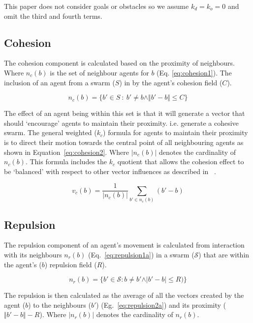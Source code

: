 \documentclass[12pt,a4paper]{IEEEtran}
\newcommand{\magn}[1]{\Vert{#1}\Vert}
\newcommand{\card}[1]{\vert{#1}\vert}
\newcommand{\vbb}[2]{#2-#1}
\newcommand{\kc}{\mathit{k_c}}
\newcommand{\kd}{\mathit{k_d}}
\newcommand{\ko}{\mathit{k_o}}
\newcommand{\rb}{\mathit{R}}
\begin{document}
This paper does not consider goals or obstacles so we assume $\kd = \ko = 0$ and omit the third and fourth terms.

\subsection{Cohesion}\label{cohesion}
The cohesion component is calculated based on the proximity of neighbours. Where $n_c(b)$ is the set of neighbour agents for $b$ (Eq. \ref{eq:cohesion1}). The inclusion of an agent from a swarm ($S$) in by the agent's cohesion field ($C$).

\begin{equation}\label{eq:cohesion1}
n_c(b) = \{b' \in S~:~b' \neq b \land\magn{\vbb{b}{b'}} \leq C\}
\end{equation}

The effect of an agent being within this set is that it will generate a vector that should `encourage' agents to maintain their proximity. i.e. generate a cohesive swarm. The general weighted ($\kc$) formula for agents to maintain their proximity is to direct their motion towards the central point of all neighbouring agents as shown in Equation~\ref{eq:cohesion2}. Where $\card{n_c(b)}$ denotes the cardinality of $n_c(b)$. This formula includes the $\kc$ quotient that allows the cohesion effect to be `balanced' with respect to other vector influences as described in ~\cite{eliot2017methods,eliot2018metric,eliot2019void}. 

\begin{equation}\label{eq:cohesion2}
v_c(b) = \frac{1}{\card{n_c(b)}} \sum_{b' \in n_c(b)}(\vbb{b}{b'})
\end{equation}

\subsection{Repulsion}\label{repulsion:neighbours}
The repulsion component of an agent's movement is calculated from interaction with its neighbours $n_r(b)$ (Eq.~\ref{eq:repulsion1a}) in a swarm ($\mathcal{S}$) that are within the agent's ($b$) repulsion field ($\rb$).

\begin{equation}\label{eq:repulsion1a}
n_r(b) = \{b' \in \mathcal{S} : b \neq b' \land \card{\vbb{b}{b'}} \leq \rb)\}
\end{equation}

The repulsion is then calculated as the average of all the vectors created by the agent ($b$) to the neighbours ($b'$) (Eg.~\ref{eq:repulsion2a}) and its proximity ($\magn{\vbb{b}{b'}} - \rb$). Where $\card{n_r(b)}$ denotes the cardinality of $n_r(b)$.
\end{document}
